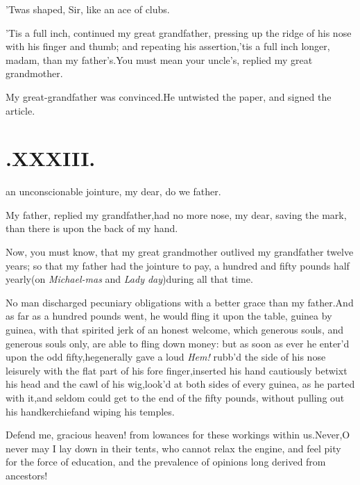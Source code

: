 \documentclass{article}
\begin{document}
\tsh ’Twas shaped, Sir, like an ace of clubs.

\tsh ’Tis a full inch, continued my great grandfather,
pressing up the ridge of his nose with his finger and thumb; and
repeating his assertion,\tsh ’tis a full inch longer,
madam, than my father’s\tsh.\break You must mean your
uncle’s, replied my great grandmother.

\tsh My great-grandfather was convinced.\tsk He
untwisted the paper, and signed the article.

\section{.\quad  XXXIII.}

 an unconscionable\break
jointure, my dear, do we
father.

My father, replied my grandfather,\break had no more nose, my dear,
saving the mark, than there is upon the back of my\break
hand.\tsh

\tsk Now, you must know, that my great grandmother outlived my
grandfather twelve years; so that my father
had the
jointure to pay, a hundred and fifty pounds half yearly\tsk (on
\textit{Michael-\break mas} and \textit{Lady day})\tsk during all
that\break
time.

No man discharged pecuniary obligations with a better grace than
my father.\tsh And as far as a hundred pounds went, he
would fling it upon the table, guinea by guinea, with that spirited
jerk of an honest welcome, which generous souls, and generous souls
only, are able to fling down money: but as soon as ever he
enter’d upon the odd fifty,\tsk he\break generally gave a loud
\textit{Hem!} rubb’d the side of his nose leisurely with the
flat part of his fore finger,\tsh inserted his hand
cautiously betwixt his head and the cawl of his
wig,\tsk look’d at both sides of every guinea, as he parted
with it,\tsk and seldom could get to the end of the fifty
pounds, without pulling out his handkerchief\break and wiping his
temples.

Defend me, gracious heaven! from 
lowances for these workings within us.\tsk Never,\tsk O never may I lay down in their
tents, who cannot relax the engine, and feel pity for the force of
education, and the prevalence of opinions long derived from
ancestors!
\end{document}
